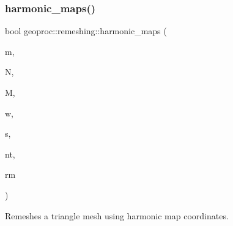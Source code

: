 \subsubsection{\texorpdfstring{harmonic\+\_\+maps()}{harmonic\_maps()}\hspace{0.1cm}{\footnotesize\ttfamily [2/4]}}
{\footnotesize\ttfamily bool geoproc\+::remeshing\+::harmonic\+\_\+maps (\begin{DoxyParamCaption}\item[{const \hyperlink{classgeoproc_1_1TriangleMesh}{Triangle\+Mesh} \&}]{m,  }\item[{size\+\_\+t}]{N,  }\item[{size\+\_\+t}]{M,  }\item[{const \hyperlink{namespacegeoproc_a12e5a10581b53b9dd9a509127527f843}{weight} \&}]{w,  }\item[{const \hyperlink{namespacegeoproc_a494da744a805b80f842402f0a806ccfc}{boundary\+\_\+shape} \&}]{s,  }\item[{size\+\_\+t}]{nt,  }\item[{\hyperlink{classgeoproc_1_1TriangleMesh}{Triangle\+Mesh} \&}]{rm }\end{DoxyParamCaption})}



Remeshes a triangle mesh using harmonic map coordinates. 


